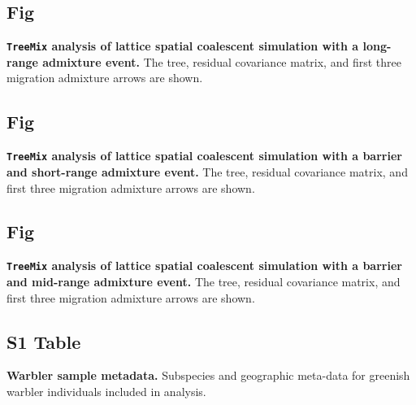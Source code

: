 \documentclass[10pt,letterpaper]{article}
\begin{document}
\subsection{Fig}
\label{sfig:treemix_corneradmixture}
{\bf{
\texttt{TreeMix} analysis of lattice spatial coalescent simulation with a long-range admixture event.}}
The tree, residual covariance matrix, and first three migration admixture arrows are shown.

\subsection{Fig}
\label{sfig:treemix_neighboradmixture}
{\bf{
\texttt{TreeMix} analysis of lattice spatial coalescent simulation with a barrier and short-range admixture event.}}  
The tree, residual covariance matrix, and first three migration admixture arrows are shown.

\subsection{Fig}
\label{sfig:treemix_inlandadmixture}
{\bf{
\texttt{TreeMix} analysis of lattice spatial coalescent simulation with a barrier and mid-range admixture event.}}  
The tree, residual covariance matrix, and first three migration admixture arrows are shown.

\subsection*{S1 Table}
\label{stab:warbler_data_table}
{\bf{
Warbler sample metadata.}}
Subspecies and geographic meta-data for greenish warbler individuals included in analysis.
\end{document}
